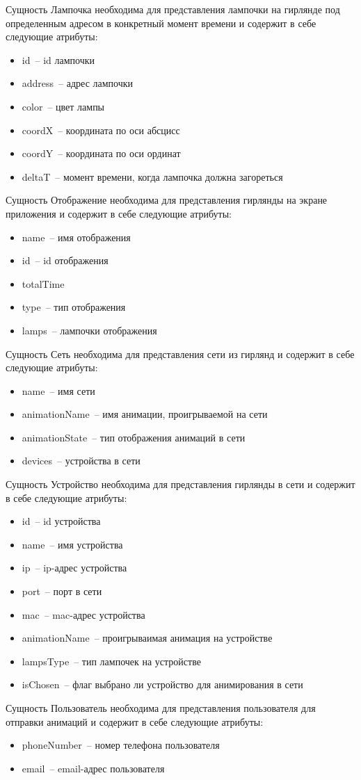 Сущность Лампочка необходима для представления лампочки на гирлянде под определенным адресом в конкретный момент времени и содержит в себе следующие атрибуты:
\begin{itemize}
	\item id~-- id лампочки
	\item address~-- адрес лампочки
	\item color~-- цвет лампы
	\item coordX~-- координата по оси абсцисс
	\item coordY~-- координата по оси ординат
	\item deltaT~-- момент времени, когда лампочка должна загореться
\end{itemize}

Сущность Отображение необходима для представления гирлянды на экране приложения и содержит в себе следующие атрибуты:
\begin{itemize}
	\item name~-- имя отображения
	\item id~-- id отображения
	\item totalTime
	\item type~-- тип отображения
	\item lamps~-- лампочки отображения
\end{itemize}

Сущность Сеть необходима для представления сети из гирлянд и содержит в себе следующие атрибуты:
\begin{itemize}
	\item name~-- имя сети
	\item animationName~-- имя анимации, проигрываемой на сети
	\item animationState~-- тип отображения анимаций в сети
	\item devices~-- устройства в сети
\end{itemize}

Сущность Устройство необходима для представления гирлянды в сети и содержит в себе следующие атрибуты:
\begin{itemize}
	\item id~-- id устройства
	\item name~-- имя устройства
	\item ip~-- ip-адрес устройства
	\item port~-- порт в сети
	\item mac~-- mac-адрес устройства
	\item animationName~-- проигрываимая анимация на устройстве
	\item lampsType~-- тип лампочек на устройстве
	\item isChosen~-- флаг выбрано ли устройство для анимирования в сети
\end{itemize}

Сущность Пользователь необходима для представления пользователя для отправки анимаций и содержит в себе следующие атрибуты:
\begin{itemize}
	\item phoneNumber~-- номер телефона пользователя
	\item email~-- email-адрес пользователя
\end{itemize}